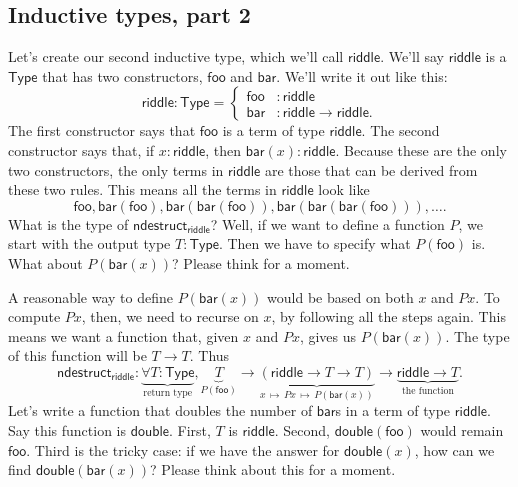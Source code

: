 \documentclass[11pt,paper=letter]{scrartcl}
\newcommand{\sf}{\mathsf}
\newcommand{\type}{\mathsf{Type}}
\newcommand{\smapsto}{\,\mapsto\,}
\begin{document}
\subsection{Inductive types, part 2}

Let's create our second inductive type, which we'll call $\sf{riddle}$. We'll say $\sf{riddle}$ is a $\type$ that has two constructors, $\sf{foo}$ and $\sf{bar}$. We'll write it out like this: \[
  \sf{riddle} : \type = \begin{cases}
    \sf{foo}&: \sf{riddle} \\
    \sf{bar}&: \sf{riddle} \to \sf{riddle}.
  \end{cases}
\]
The first constructor says that $\sf{foo}$ is a term of type $\sf{riddle}$. The second constructor says that, if $x : \sf{riddle}$, then $\sf{bar}(x) : \sf{riddle}$. Because these are the only two constructors, the only terms in $\sf{riddle}$ are those that can be derived from these two rules. This means all the terms in $\sf{riddle}$ look like \[
  \sf{foo}, \sf{bar}(\sf{foo}), \sf{bar}(\sf{bar}(\sf{foo})), \sf{bar}(\sf{bar}(\sf{bar}(\sf{foo}))), \ldots.
\]
What is the type of $\sf{ndestruct}_\sf{riddle}$? Well, if we want to define a function $P$, we start with the output type $T : \type$. Then we have to specify what $P(\sf{foo})$ is. What about $P(\sf{bar}(x))$? Please think for a moment.

A reasonable way to define $P(\sf{bar}(x))$ would be based on both $x$ and $Px$. To compute $Px$, then, we need to recurse on $x$, by following all the steps again. This means we want a function that, given $x$ and $Px$, gives us $P(\sf{bar}(x))$. The type of this function will be $T \to T$. Thus \[
\sf{ndestruct}_{\sf{riddle}}
:
\underbrace{\forall T: \type}_{\text{return type}},
\underbrace{T}_{P(\sf{foo})} \to
\underbrace{(\sf{riddle} \to T \to T)}_{x\smapsto Px\smapsto P(\sf{bar}(x))} \to
\underbrace{\sf{riddle} \to T}_{\text{the function}}.
\]
Let's write a function that doubles the number of $\sf{bar}$s in a term of type $\sf{riddle}$. Say this function is $\sf{double}$. First, $T$ is $\sf{riddle}$. Second, $\sf{double}(\sf{foo})$ would remain $\sf{foo}$. Third is the tricky case: if we have the answer for $\sf{double}(x)$, how can we find $\sf{double}(\sf{bar}(x))$? Please think about this for a moment.
\end{document}
